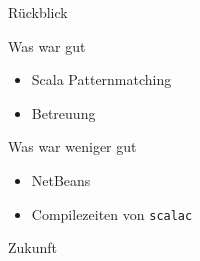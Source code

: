 \documentclass[hyperref={pdfpagelabels=false}]{beamer}
\begin{document}
\begin{frame}{Rückblick}
  \begin{exampleblock}{Was war gut}
    \begin{itemize}
      \item Scala Patternmatching
      \item Betreuung \smiley
    \end{itemize}
  \end{exampleblock}
  \begin{alertblock}{Was war weniger gut}
    \begin{itemize}
      \item NetBeans
      \item Compilezeiten von \texttt{scalac}
    \end{itemize}
  \end{alertblock}
\end{frame}

\begin{frame}{Zukunft}
\end{frame}
\end{document}
